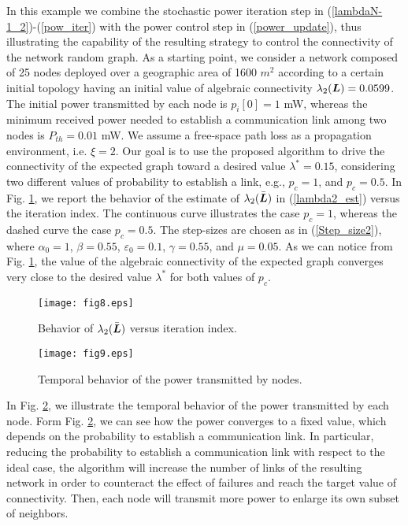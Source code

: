 \documentclass[10pt,twocolumn]{IEEEtran}
\def\bL{\mbox{\boldmath $L$}}
\begin{document}
 In this example we combine the stochastic power iteration step in (\ref{lambdaN-1_2})-(\ref{pow_iter}) with the power control step in (\ref{power_update}), thus illustrating the capability of the resulting strategy to control the connectivity of the network random graph.
As a starting point, we consider a network composed of 25 nodes deployed over a geographic area of 1600 $m^2$ according to a certain initial topology having an initial value of algebraic connectivity $\lambda_2(\bL)=0.0599$. The initial power transmitted by each node is $p_i[0]=1$ mW, whereas the minimum received power needed to establish a communication link among two nodes is $P_{th}=0.01$ mW. We assume a free-space path loss as a propagation environment, i.e. $\xi=2$. Our goal is to use the proposed algorithm to drive the connectivity of the expected graph toward a desired value $\lambda^*=0.15$, considering two different values of probability to establish a link, e.g., $p_c=1$, and $p_c=0.5$. In Fig. \ref{lambda2pc}, we report the behavior of the estimate of $\lambda_2(\bar{\bL})$ in (\ref{lambda2_est}) versus the iteration index. The continuous curve illustrates the case $p_c=1$, whereas the dashed curve the case $p_c=0.5$. The step-sizes are chosen as in (\ref{Step_size2}), where $\alpha_0=1$, $\beta=0.55$, $\varepsilon_0=0.1$, $\gamma=0.55$, and $\mu=0.05$. As we can notice from Fig. \ref{lambda2pc}, the value of the algebraic connectivity of the expected graph converges very close to the desired value $\lambda^*$ for both values of $p_c$.
\begin{figure}[t]
\centering
\texttt{[image: fig8.eps]}
  \caption{Behavior of $\lambda_2(\bar{\bL})$ versus iteration index.}\label{lambda2pc}
\end{figure}
\begin{figure}[t]
\centering
\texttt{[image: fig9.eps]}
  \caption{Temporal behavior of the power transmitted by nodes.}\label{sum_power}
\end{figure}
In Fig. \ref{sum_power}, we illustrate the temporal behavior of the power transmitted by each node. Form Fig. \ref{sum_power}, we can see how the power converges to a fixed value, which depends on the probability to establish a communication link. In particular, reducing the probability to establish a communication link with respect to the ideal case, the algorithm will increase the number of links of the resulting network in order to counteract the effect of failures and reach the target value of connectivity. Then, each node will transmit more power to enlarge its own subset of neighbors.
\end{document}
